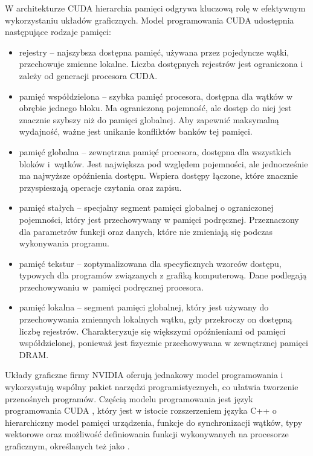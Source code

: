W architekturze CUDA hierarchia pamięci odgrywa kluczową rolę w efektywnym wykorzystaniu
układów graficznych. Model programowania CUDA udostępnia następujące rodzaje pamięci:
\begin{itemize}
      \item rejestry -- najszybsza dostępna pamięć, używana przez pojedyncze wątki, przechowuje
            zmienne lokalne. Liczba dostępnych rejestrów jest ograniczona i zależy od generacji procesora CUDA.
      \item pamięć współdzielona -- szybka pamięć procesora, dostępna dla wątków w obrębie jednego bloku.
            Ma ograniczoną pojemność, ale dostęp do niej jest znacznie szybszy niż do pamięci globalnej.
            Aby zapewnić maksymalną wydajność, ważne jest unikanie konfliktów banków tej pamięci.
      \item pamięć globalna -- zewnętrzna pamięć procesora, dostępna dla wszystkich bloków i~wątków.
            Jest największa pod względem pojemności, ale jednocześnie ma najwyższe opóźnienia dostępu.
            Wspiera dostępy łączone, które znacznie przyspieszają operacje czytania oraz zapisu.
      \item pamięć stałych -- specjalny segment pamięci globalnej o ograniczonej pojemności, który
            jest przechowywany w pamięci podręcznej. Przeznaczony dla parametrów funkcji oraz danych,
            które nie zmieniają się podczas wykonywania programu. \newpage
      \item pamięć tekstur -- zoptymalizowana dla specyficznych wzorców dostępu, typowych dla programów
            związanych z grafiką komputerową. Dane podlegają przechowywaniu w~pamięci podręcznej procesora.
      \item pamięć lokalna -- segment pamięci globalnej, który jest używany do przechowywania zmiennych
            lokalnych wątku, gdy przekroczy on dostępną liczbę rejestrów. Charakteryzuje się większymi
            opóźnieniami od pamięci współdzielonej, ponieważ jest fizycznie przechowywana w zewnętrznej pamięci DRAM.
\end{itemize}


Układy graficzne firmy NVIDIA oferują jednakowy model programowania i wykorzystują wspólny pakiet narzędzi
programistycznych, co ułatwia tworzenie przenośnych programów. Częścią modelu programowania jest język
programowania CUDA \cite{cuda-by-example}, który jest w istocie rozszerzeniem języka C++ o hierarchiczny
model pamięci urządzenia, funkcje do synchronizacji wątków, typy wektorowe oraz możliwość definiowania
funkcji wykonywanych na procesorze graficznym, określanych też jako .

